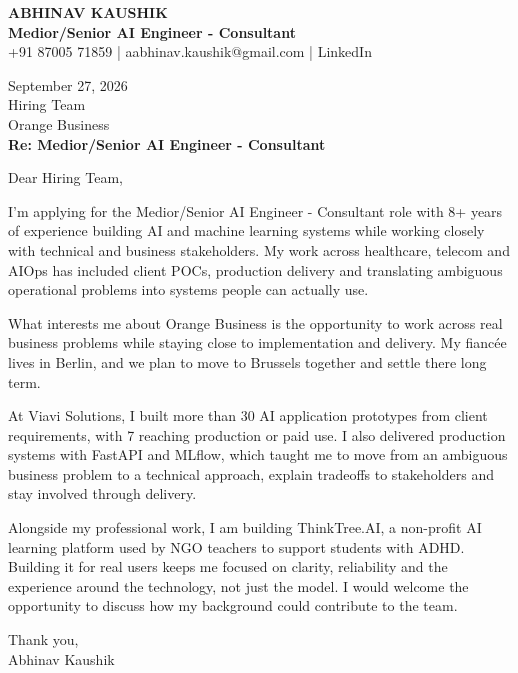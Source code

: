 \documentclass[10pt,a4paper]{article}
\begin{document}
\begin{center}
{\Large\bfseries ABHINAV KAUSHIK}\\[2pt]
{\bfseries Medior/Senior AI Engineer - Consultant}\\[2pt]
+91 87005 71859 \quad | \quad aabhinav.kaushik@gmail.com \quad | \quad LinkedIn
\end{center}
\vspace{8pt}
September 27, 2026\\[6pt]
Hiring Team\\
Orange Business\\[4pt]
\textbf{Re: Medior/Senior AI Engineer - Consultant}

Dear Hiring Team,

I’m applying for the Medior/Senior AI Engineer - Consultant role with 8+ years of experience building AI and machine learning systems while working closely with technical and business stakeholders. My work across healthcare, telecom and AIOps has included client POCs, production delivery and translating ambiguous operational problems into systems people can actually use.

What interests me about Orange Business is the opportunity to work across real business problems while staying close to implementation and delivery. My fiancée lives in Berlin, and we plan to move to Brussels together and settle there long term.

At Viavi Solutions, I built more than 30 AI application prototypes from client requirements, with 7 reaching production or paid use. I also delivered production systems with FastAPI and MLflow, which taught me to move from an ambiguous business problem to a technical approach, explain tradeoffs to stakeholders and stay involved through delivery.

Alongside my professional work, I am building ThinkTree.AI, a non-profit AI learning platform used by NGO teachers to support students with ADHD. Building it for real users keeps me focused on clarity, reliability and the experience around the technology, not just the model. I would welcome the opportunity to discuss how my background could contribute to the team.

Thank you,\\
Abhinav Kaushik
\end{document}
